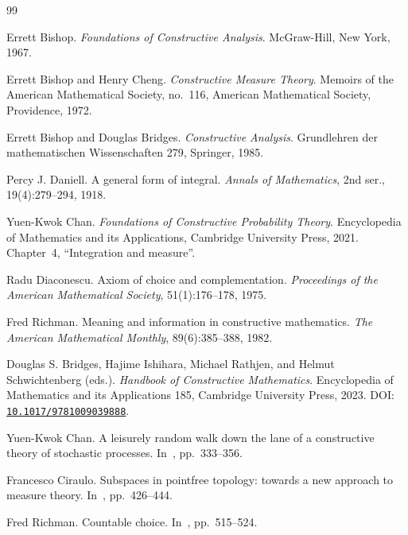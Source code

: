 \documentclass[11pt]{article}
\theoremstyle{definition}
\theoremstyle{remark}
\newcommand{\doi}[1]{\href{https://doi.org/#1}{\texttt{#1}}}
\begin{document}
\begin{thebibliography}{99}
\raggedright

Errett Bishop.
\newblock \emph{Foundations of Constructive Analysis}.
\newblock McGraw-Hill, New York, 1967.

Errett Bishop and Henry Cheng.
\newblock \emph{Constructive Measure Theory}.
\newblock Memoirs of the American Mathematical Society, no.~116, American Mathematical Society, Providence, 1972.

Errett Bishop and Douglas Bridges.
\newblock \emph{Constructive Analysis}.
\newblock Grundlehren der mathematischen Wissenschaften 279, Springer, 1985.

Percy J. Daniell.
\newblock A general form of integral.
\newblock \emph{Annals of Mathematics}, 2nd ser., 19(4):279--294, 1918.

Yuen-Kwok Chan.
\newblock \emph{Foundations of Constructive Probability Theory}.
\newblock Encyclopedia of Mathematics and its Applications, Cambridge University Press, 2021.
\newblock Chapter~4, ``Integration and measure''.

Radu Diaconescu.
\newblock Axiom of choice and complementation.
\newblock \emph{Proceedings of the American Mathematical Society}, 51(1):176--178, 1975.

Fred Richman.
\newblock Meaning and information in constructive mathematics.
\newblock \emph{The American Mathematical Monthly}, 89(6):385--388, 1982.

Douglas S. Bridges, Hajime Ishihara, Michael Rathjen, and Helmut Schwichtenberg (eds.).
\newblock \emph{Handbook of Constructive Mathematics}.
\newblock Encyclopedia of Mathematics and its Applications 185, Cambridge University Press, 2023.
\newblock DOI: \doi{10.1017/9781009039888}.

Yuen-Kwok Chan.
\newblock A leisurely random walk down the lane of a constructive theory of stochastic processes.
\newblock In~\cite{handbook-2023}, pp.~333--356.

Francesco Ciraulo.
\newblock Subspaces in pointfree topology: towards a new approach to measure theory.
\newblock In~\cite{handbook-2023}, pp.~426--444.

Fred Richman.
\newblock Countable choice.
\newblock In~\cite{handbook-2023}, pp.~515--524.


\end{thebibliography}
\end{document}
